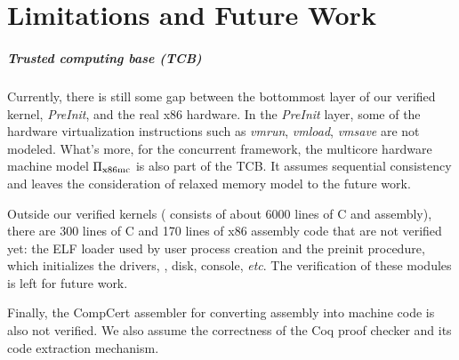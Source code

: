 \chapter{Limitations and Future Work}
\label{chap-limits}


\paragraph{Trusted computing base (TCB)}
Currently, there is still some gap between the bottommost layer of our
verified kernel, {\it PreInit}, and the real x86 hardware.
In the {\it PreInit} layer, some of the hardware virtualization
instructions such as {\it vmrun}, {\it vmload}, {\it vmsave}
are not modeled. 
What's more,
for the concurrent framework,
the multicore hardware machine model $\Pi_{\text{x86mc}}$
is also part of the TCB.
It assumes sequential consistency
and leaves the consideration of relaxed memory model
to the future work.



Outside our verified kernels
(\mCTOShyper{} consists of about 6000 lines of C and assembly), there
are 300 lines of C and 170 lines of x86 assembly code that are not
verified yet: the ELF loader used by user
process creation
and the preinit procedure, which initializes the drivers, \eg,
disk, console, {\it etc}.
The verification of these modules is
left for future work. 

Finally, the CompCert assembler for converting assembly into machine
code is also not verified. We also assume the correctness of the Coq
proof checker and its code extraction mechanism.

